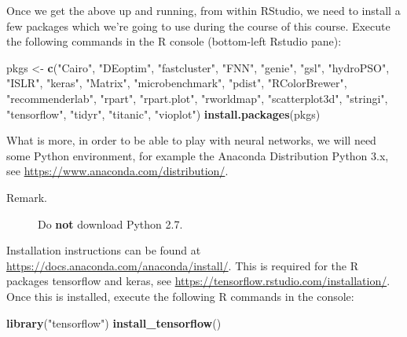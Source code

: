 \documentclass[10pt,b5paper,krantz1]{krantz}
\newenvironment{Shaded}{\begin{snugshade}}{\end{snugshade}}
\newcommand{\KeywordTok}[1]{\textcolor[rgb]{0.27,0.27,0.27}{\textbf{#1}}}
\newcommand{\NormalTok}[1]{#1}
\newcommand{\StringTok}[1]{\textcolor[rgb]{0.5,0.5,0.5}{#1}}
\begin{document}
Once we get the above up and running, from within RStudio,
we need to install a few packages which we're going to use during the course
of this course. Execute the following commands in the R console
(bottom-left Rstudio pane):

\begin{Shaded}
\begin{Highlighting}[]
\NormalTok{pkgs <-}\StringTok{ }\KeywordTok{c}\NormalTok{(}\StringTok{"Cairo"}\NormalTok{, }\StringTok{"DEoptim"}\NormalTok{, }\StringTok{"fastcluster"}\NormalTok{, }\StringTok{"FNN"}\NormalTok{, }\StringTok{"genie"}\NormalTok{,}
    \StringTok{"gsl"}\NormalTok{, }\StringTok{"hydroPSO"}\NormalTok{, }\StringTok{"ISLR"}\NormalTok{, }\StringTok{"keras"}\NormalTok{, }\StringTok{"Matrix"}\NormalTok{,}
    \StringTok{"microbenchmark"}\NormalTok{, }\StringTok{"pdist"}\NormalTok{, }\StringTok{"RColorBrewer"}\NormalTok{,}
    \StringTok{"recommenderlab"}\NormalTok{, }\StringTok{"rpart"}\NormalTok{, }\StringTok{"rpart.plot"}\NormalTok{, }\StringTok{"rworldmap"}\NormalTok{,}
    \StringTok{"scatterplot3d"}\NormalTok{, }\StringTok{"stringi"}\NormalTok{, }\StringTok{"tensorflow"}\NormalTok{, }\StringTok{"tidyr"}\NormalTok{,}
    \StringTok{"titanic"}\NormalTok{, }\StringTok{"vioplot"}\NormalTok{)}
\KeywordTok{install.packages}\NormalTok{(pkgs)}
\end{Highlighting}
\end{Shaded}

What is more, in order to be able to play with neural networks,
we will need some Python environment, for example
the Anaconda Distribution Python 3.x, see
\url{https://www.anaconda.com/distribution/}.

\begin{description}
\item[Remark.]
Do \textbf{not} download Python 2.7.
\end{description}

Installation instructions can be found at
\url{https://docs.anaconda.com/anaconda/install/}.
This is required for the R packages tensorflow and keras,
see \url{https://tensorflow.rstudio.com/installation/}.
Once this is installed, execute the following R commands in the console:

\begin{Shaded}
\begin{Highlighting}[]
\KeywordTok{library}\NormalTok{(}\StringTok{"tensorflow"}\NormalTok{)}
\KeywordTok{install_tensorflow}\NormalTok{()}
\end{Highlighting}
\end{Shaded}
\end{document}
